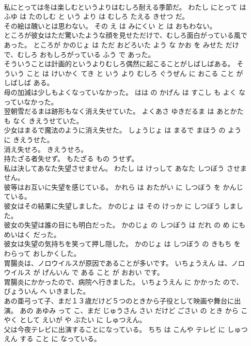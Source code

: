 \documentclass[8pt]{extreport}
\begin{document}
\begin{CJK}{UTF8}{min}
\\	私にとっては冬は楽しむというよりはむしろ耐える季節だ。	わたし にとって は ふゆ は たのしむ と いう より は むしろ たえる きせつ だ。	
\\	その絵は醜いとは思わない。	その え は みにくい と は おもわない。	
\\	ところが彼女はただ驚いたような顔を見せただけで、むしろ面白がっている風であった。	ところが かのじょ は ただ おどろいた よう な かお を みせた だけ で、むしろ おもしろがっている ふう で あった。	
\\	そういうことは計画的というよりむしろ偶然に起こることがしばしばある。	そういう こと は けいかく てき と いう より むしろ ぐうぜん に おこる こと が しばしば ある。	
\\	母の加減は少しもよくなっていなかった。	はは の かげん は すこし も よく なっていなかった。	
\\	翌朝雪だるまは跡形もなく消え失せていた。	よくあさ ゆきだるま は あとかた も なく きえうせていた。	
\\	少女はまるで魔法のように消え失せた。	しょうじょ は まるで まほう の よう に きえうせた。	
\\	消え失せろ。	きえうせろ。	
\\	持たざる者失せず。	もたざる もの うせず。	
\\	私は決してあなた失望させません。	わたし は けっして あなた しつぼう させません。	
\\	彼等はお互いに失望を感じている。	かれら は おたがい に しつぼう を かんじている。	
\\	彼女はその結果に失望しました。	かのじょ は その けっか に しつぼう しました。	
\\	彼女の失望は誰の目にも明白だった。	かのじょ の しつぼう は だれ の め にも めいはく だった。	
\\	彼女は失望の気持ちを笑って押し隠した。	かのじょ は しつぼう の きもち を わらって おしかくした。	
\\	胃腸炎は、ノロウイルスが原因であることが多いです。	いちょうえん は、ノロウイルス が げんいん で ある こと が おおい です。	
\\	胃腸炎にかかったので、病院へ行きました。	いちょうえん に かかった ので、びょういん へ いきました。	
\\	あの亜弓って子、まだ１３歳だけど５つのときから子役として映画や舞台に出演。	あの あゆみ って こ、まだ じゅうさん さい だけど ごさい の とき から こやく として えいが や ぶたい に しゅつえん。	
\\	父は今夜テレビに出演することになっている。	ちち は こんや テレビ に しゅつえん する こと に なっている。	

\end{CJK}
\end{document}
